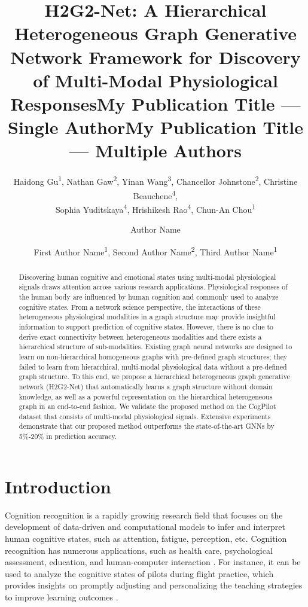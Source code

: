 \documentclass[letterpaper]{article} %
\title{H2G2-Net: A Hierarchical Heterogeneous Graph Generative Network Framework for Discovery of Multi-Modal Physiological Responses}
\author{
    Haidong Gu\textsuperscript{\rm 1},
    Nathan Gaw\textsuperscript{\rm 2},
    Yinan Wang\textsuperscript{\rm 3},
    Chancellor Johnstone\textsuperscript{\rm 2},
    Christine Beauchene\textsuperscript{\rm 4},\\
    Sophia Yuditskaya\textsuperscript{\rm 4},
    Hrishikesh Rao\textsuperscript{\rm 4},
    Chun-An Chou\textsuperscript{\rm 1}
}
\title{My Publication Title --- Single Author}
\author {
    Author Name
}
\title{My Publication Title --- Multiple Authors}
\author {
    First Author Name\textsuperscript{\rm 1},
    Second Author Name\textsuperscript{\rm 2},
    Third Author Name\textsuperscript{\rm 1}
}
\begin{document}
\maketitle

\begin{abstract}
Discovering human cognitive and emotional states using multi-modal physiological signals draws attention across various research applications. Physiological responses of the human body are influenced by human cognition and commonly used to analyze cognitive states. From a network science perspective, the interactions of these heterogeneous physiological modalities in a graph structure may provide insightful information to support prediction of cognitive states. However, there is no clue to derive exact connectivity between heterogeneous modalities and there exists a hierarchical structure of sub-modalities. Existing graph neural networks are designed to learn on non-hierarchical homogeneous graphs with pre-defined graph structures; they failed to learn from hierarchical, multi-modal physiological data without a pre-defined graph structure. To this end, we propose a hierarchical heterogeneous graph generative network (H2G2-Net) that automatically learns a graph structure without domain knowledge, as well as a powerful representation on the hierarchical heterogeneous graph in an end-to-end fashion. We validate the proposed method on the CogPilot dataset that consists of multi-modal physiological signals. Extensive experiments demonstrate that our proposed method outperforms the state-of-the-art GNNs by 5\%-20\% in prediction accuracy.
\end{abstract}



\section{Introduction}

Cognition recognition is a rapidly growing research field that focuses on the development of data-driven and computational models to infer and interpret human cognitive states, such as attention, fatigue, perception, etc. Cognition recognition has numerous applications, such as health care, psychological assessment, education, and human-computer interaction \cite{gu2021detecting, gu2022optimizing, jia2021hetemotionnet, zheng2018emotionmeter, caballero4170114toward}. For instance, it can be used to analyze the cognitive states of pilots during flight practice, which provides insights on promptly adjusting and personalizing the teaching strategies to improve learning outcomes \cite{caballero4170114toward}.
\end{document}
